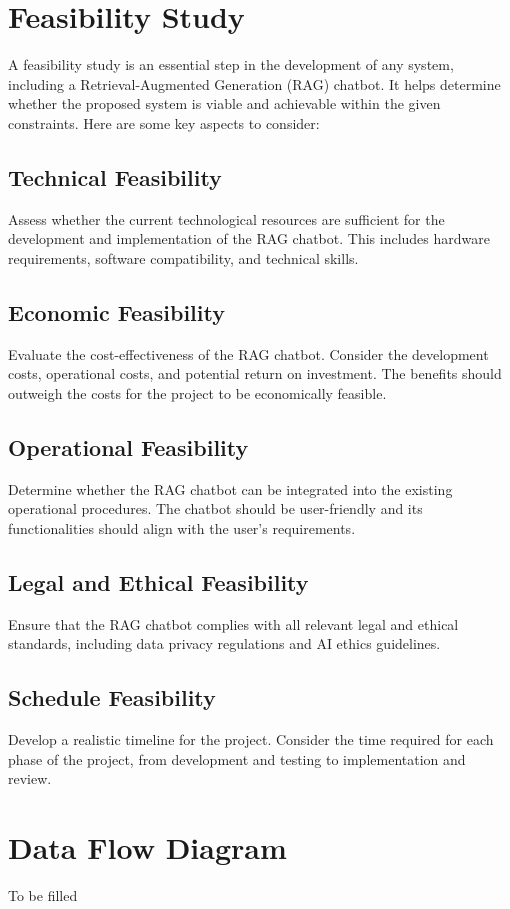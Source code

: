 \section{Feasibility Study}
A feasibility study is an essential step in the development of any system, including a Retrieval-Augmented Generation (RAG) chatbot. It helps determine whether the proposed system is viable and achievable within the given constraints. Here are some key aspects to consider:
\subsection{Technical Feasibility}
Assess whether the current technological resources are sufficient for the development and implementation of the RAG chatbot. This includes hardware requirements, software compatibility, and technical skills.
\subsection{Economic Feasibility}
Evaluate the cost-effectiveness of the RAG chatbot. Consider the development costs, operational costs, and potential return on investment. The benefits should outweigh the costs for the project to be economically feasible.
\subsection{Operational Feasibility}
Determine whether the RAG chatbot can be integrated into the existing operational procedures. The chatbot should be user-friendly and its functionalities should align with the user's requirements.
\subsection{Legal and Ethical Feasibility}
Ensure that the RAG chatbot complies with all relevant legal and ethical standards, including data privacy regulations and AI ethics guidelines.
\subsection{Schedule Feasibility}
Develop a realistic timeline for the project. Consider the time required for each phase of the project, from development and testing to implementation and review.
\section{Data Flow Diagram}
To be filled 
